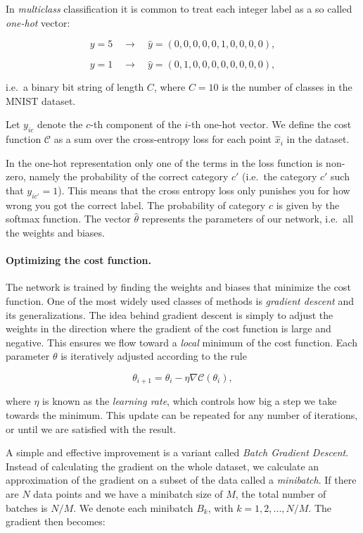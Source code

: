 \documentclass[%
oneside,                 %
final,                   %
10pt]{article}
\begin{document}
In \emph{multiclass} classification it is common to treat each integer label as a so called \emph{one-hot} vector:  

$$ y = 5 \quad \rightarrow \quad \hat{y} = (0, 0, 0, 0, 0, 1, 0, 0, 0, 0) ,$$  


$$ y = 1 \quad \rightarrow \quad \hat{y} = (0, 1, 0, 0, 0, 0, 0, 0, 0, 0) ,$$  


i.e.~a binary bit string of length $C$, where $C = 10$ is the number of classes in the MNIST dataset.  

Let $y_{ic}$ denote the $c$-th component of the $i$-th one-hot vector.  
We define the cost function $\mathcal{C}$ as a sum over the cross-entropy loss for each point $\hat{x}_i$ in the dataset.

In the one-hot representation only one of the terms in the loss function is non-zero, namely the
probability of the correct category $c'$  
(i.e.~the category $c'$ such that $y_{ic'} = 1$). This means that the cross entropy loss only punishes you for how wrong
you got the correct label. The probability of category $c$ is given by the softmax function. The vector $\hat{\theta}$ represents the parameters of our network, i.e.~all the weights and biases.  


\paragraph{Optimizing the cost function.}
The network is trained by finding the weights and biases that minimize the cost function. One of the most widely used classes of methods is \emph{gradient descent} and its generalizations. The idea behind gradient descent
is simply to adjust the weights in the direction where the gradient of the cost function is large and negative. This ensures we flow toward a \emph{local} minimum of the cost function.  
Each parameter $\theta$ is iteratively adjusted according to the rule  

$$ \theta_{i+1} = \theta_i - \eta \nabla \mathcal{C}(\theta_i) ,$$

where $\eta$ is known as the \emph{learning rate}, which controls how big a step we take towards the minimum.  
This update can be repeated for any number of iterations, or until we are satisfied with the result.  

A simple and effective improvement is a variant called \emph{Batch Gradient Descent}.  
Instead of calculating the gradient on the whole dataset, we calculate an approximation of the gradient
on a subset of the data called a \emph{minibatch}.  
If there are $N$ data points and we have a minibatch size of $M$, the total number of batches
is $N/M$.  
We denote each minibatch $B_k$, with $k = 1, 2,...,N/M$. The gradient then becomes:  
\end{document}
